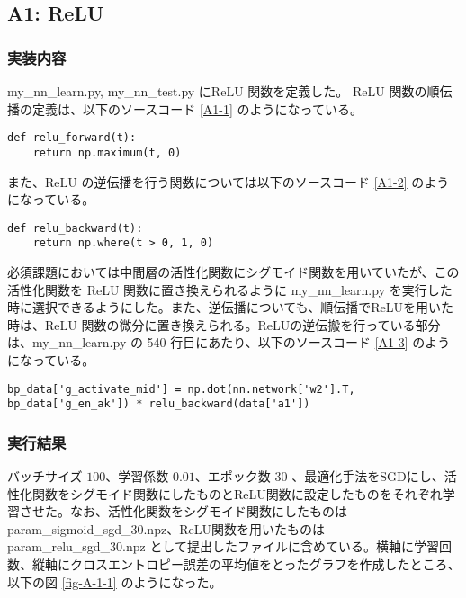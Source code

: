 \documentclass[a4paper,dvipdfmx]{jsarticle}
\begin{document}
\subsection*{A1: ReLU}

\subsubsection*{実装内容}

my\_nn\_learn.py, my\_nn\_test.py にReLU 関数を定義した。
ReLU 関数の順伝播の定義は、以下のソースコード \ref{A1-1} のようになっている。

\begin{lstlisting}[caption="ReLU 関数(順伝播)",label=A1-1]
def relu_forward(t):
    return np.maximum(t, 0)
\end{lstlisting}

また、ReLU の逆伝播を行う関数については以下のソースコード \ref{A1-2} のようになっている。

\begin{lstlisting}[caption="ReLU 関数(逆伝播)",label=A1-2]
def relu_backward(t):
    return np.where(t > 0, 1, 0)
\end{lstlisting}

必須課題においては中間層の活性化関数にシグモイド関数を用いていたが、この活性化関数を ReLU 関数に置き換えられるように my\_nn\_learn.py を実行した時に選択できるようにした。また、逆伝播についても、順伝播でReLUを用いた時は、ReLU 関数の微分に置き換えられる。ReLUの逆伝搬を行っている部分は、my\_nn\_learn.py の 540 行目にあたり、以下のソースコード \ref{A1-3} のようになっている。

\begin{lstlisting}[caption="ReLU の逆伝播 を行う部分",label=A1-3]
bp_data['g_activate_mid'] = np.dot(nn.network['w2'].T, bp_data['g_en_ak']) * relu_backward(data['a1'])
\end{lstlisting}

\subsubsection*{実行結果}

バッチサイズ $100$、学習係数 $0.01$、エポック数 $30$ 、最適化手法をSGDにし、活性化関数をシグモイド関数にしたものとReLU関数に設定したものをそれぞれ学習させた。なお、活性化関数をシグモイド関数にしたものは param\_sigmoid\_sgd\_30.npz、ReLU関数を用いたものは param\_relu\_sgd\_30.npz として提出したファイルに含めている。横軸に学習回数、縦軸にクロスエントロピー誤差の平均値をとったグラフを作成したところ、以下の図 \ref{fig-A-1-1} のようになった。
\end{document}
